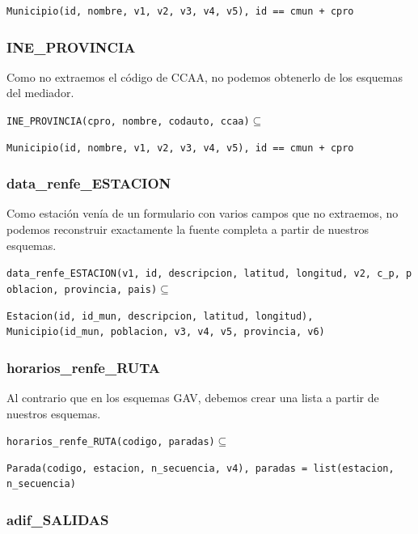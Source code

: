 \begin{verbatim}
Municipio(id, nombre, v1, v2, v3, v4, v5), id == cmun + cpro
\end{verbatim}

\subsubsection{INE\_PROVINCIA}\label{ine_provincia}

Como no extraemos el código de CCAA, no podemos obtenerlo de los
esquemas del mediador.

\texttt{INE\_PROVINCIA(cpro,\ nombre,\ codauto,\ ccaa)}\(\subseteq\)

\begin{verbatim}
Municipio(id, nombre, v1, v2, v3, v4, v5), id == cmun + cpro
\end{verbatim}

\subsubsection{data\_renfe\_ESTACION}\label{data_renfe_estacion}

Como estación venía de un formulario con varios campos que no extraemos,
no podemos reconstruir exactamente la fuente completa a partir de
nuestros esquemas.

\texttt{data\_renfe\_ESTACION(v1,\ id,\ descripcion,\ latitud,\ longitud,\ v2,\ c\_p,\ poblacion,\ provincia,\ pais)}\(\subseteq\)

\begin{verbatim}
Estacion(id, id_mun, descripcion, latitud, longitud), 
Municipio(id_mun, poblacion, v3, v4, v5, provincia, v6)
\end{verbatim}

\subsubsection{horarios\_renfe\_RUTA}\label{horarios_renfe_ruta}

Al contrario que en los esquemas GAV, debemos crear una lista a partir
de nuestros esquemas.

\texttt{horarios\_renfe\_RUTA(codigo,\ paradas)}\(\subseteq\)

\begin{verbatim}
Parada(codigo, estacion, n_secuencia, v4), paradas = list(estacion, n_secuencia)
\end{verbatim}

\subsubsection{adif\_SALIDAS}\label{adif_salidas}

